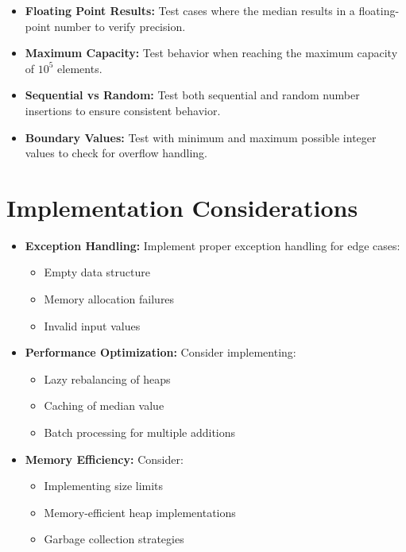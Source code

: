\begin{itemize}
    \item \textbf{Floating Point Results:} Test cases where the median results in a floating-point number to verify precision.
    
    \item \textbf{Maximum Capacity:} Test behavior when reaching the maximum capacity of \(10^5\) elements.
    
    \item \textbf{Sequential vs Random:} Test both sequential and random number insertions to ensure consistent behavior.
    
    \item \textbf{Boundary Values:} Test with minimum and maximum possible integer values to check for overflow handling.
\end{itemize}

\section*{Implementation Considerations}

\begin{itemize}
    \item \textbf{Exception Handling:} Implement proper exception handling for edge cases:
    \begin{itemize}
        \item Empty data structure
        \item Memory allocation failures
        \item Invalid input values
    \end{itemize}
    
    \item \textbf{Performance Optimization:} Consider implementing:
    \begin{itemize}
        \item Lazy rebalancing of heaps
        \item Caching of median value
        \item Batch processing for multiple additions
    \end{itemize}
    
    \item \textbf{Memory Efficiency:} Consider:
    \begin{itemize}
        \item Implementing size limits
        \item Memory-efficient heap implementations
        \item Garbage collection strategies
    \end{itemize}
\end{itemize}

